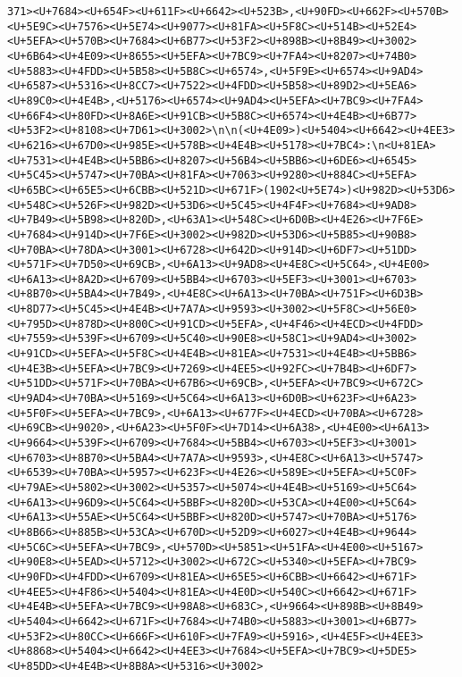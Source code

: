 \documentclass[
]{article}
\begin{document}
\begin{verbatim}
371><U+7684><U+654F><U+611F><U+6642><U+523B>,<U+90FD><U+662F><U+570B><U+5E9C><U+7576><U+5E74><U+9077><U+81FA><U+5F8C><U+514B><U+52E4><U+5EFA><U+570B><U+7684><U+6B77><U+53F2><U+898B><U+8B49><U+3002><U+6B64><U+4E09><U+8655><U+5EFA><U+7BC9><U+7FA4><U+8207><U+74B0><U+5883><U+4FDD><U+5B58><U+5B8C><U+6574>,<U+5F9E><U+6574><U+9AD4><U+6587><U+5316><U+8CC7><U+7522><U+4FDD><U+5B58><U+89D2><U+5EA6><U+89C0><U+4E4B>,<U+5176><U+6574><U+9AD4><U+5EFA><U+7BC9><U+7FA4><U+66F4><U+80FD><U+8A6E><U+91CB><U+5B8C><U+6574><U+4E4B><U+6B77><U+53F2><U+8108><U+7D61><U+3002>\n\n(<U+4E09>)<U+5404><U+6642><U+4EE3><U+6216><U+67D0><U+985E><U+578B><U+4E4B><U+5178><U+7BC4>:\n<U+81EA><U+7531><U+4E4B><U+5BB6><U+8207><U+56B4><U+5BB6><U+6DE6><U+6545><U+5C45><U+5747><U+70BA><U+81FA><U+7063><U+9280><U+884C><U+5EFA><U+65BC><U+65E5><U+6CBB><U+521D><U+671F>(1902<U+5E74>)<U+982D><U+53D6><U+548C><U+526F><U+982D><U+53D6><U+5C45><U+4F4F><U+7684><U+9AD8><U+7B49><U+5B98><U+820D>,<U+63A1><U+548C><U+6D0B><U+4E26><U+7F6E><U+7684><U+914D><U+7F6E><U+3002><U+982D><U+53D6><U+5B85><U+90B8><U+70BA><U+78DA><U+3001><U+6728><U+642D><U+914D><U+6DF7><U+51DD><U+571F><U+7D50><U+69CB>,<U+6A13><U+9AD8><U+4E8C><U+5C64>,<U+4E00><U+6A13><U+8A2D><U+6709><U+5BB4><U+6703><U+5EF3><U+3001><U+6703><U+8B70><U+5BA4><U+7B49>,<U+4E8C><U+6A13><U+70BA><U+751F><U+6D3B><U+8D77><U+5C45><U+4E4B><U+7A7A><U+9593><U+3002><U+5F8C><U+56E0><U+795D><U+878D><U+800C><U+91CD><U+5EFA>,<U+4F46><U+4ECD><U+4FDD><U+7559><U+539F><U+6709><U+5C40><U+90E8><U+58C1><U+9AD4><U+3002><U+91CD><U+5EFA><U+5F8C><U+4E4B><U+81EA><U+7531><U+4E4B><U+5BB6><U+4E3B><U+5EFA><U+7BC9><U+7269><U+4EE5><U+92FC><U+7B4B><U+6DF7><U+51DD><U+571F><U+70BA><U+67B6><U+69CB>,<U+5EFA><U+7BC9><U+672C><U+9AD4><U+70BA><U+5169><U+5C64><U+6A13><U+6D0B><U+623F><U+6A23><U+5F0F><U+5EFA><U+7BC9>,<U+6A13><U+677F><U+4ECD><U+70BA><U+6728><U+69CB><U+9020>,<U+6A23><U+5F0F><U+7D14><U+6A38>,<U+4E00><U+6A13><U+9664><U+539F><U+6709><U+7684><U+5BB4><U+6703><U+5EF3><U+3001><U+6703><U+8B70><U+5BA4><U+7A7A><U+9593>,<U+4E8C><U+6A13><U+5747><U+6539><U+70BA><U+5957><U+623F><U+4E26><U+589E><U+5EFA><U+5C0F><U+79AE><U+5802><U+3002><U+5357><U+5074><U+4E4B><U+5169><U+5C64><U+6A13><U+96D9><U+5C64><U+5BBF><U+820D><U+53CA><U+4E00><U+5C64><U+6A13><U+55AE><U+5C64><U+5BBF><U+820D><U+5747><U+70BA><U+5176><U+8B66><U+885B><U+53CA><U+670D><U+52D9><U+6027><U+4E4B><U+9644><U+5C6C><U+5EFA><U+7BC9>,<U+570D><U+5851><U+51FA><U+4E00><U+5167><U+90E8><U+5EAD><U+5712><U+3002><U+672C><U+5340><U+5EFA><U+7BC9><U+90FD><U+4FDD><U+6709><U+81EA><U+65E5><U+6CBB><U+6642><U+671F><U+4EE5><U+4F86><U+5404><U+81EA><U+4E0D><U+540C><U+6642><U+671F><U+4E4B><U+5EFA><U+7BC9><U+98A8><U+683C>,<U+9664><U+898B><U+8B49><U+5404><U+6642><U+671F><U+7684><U+74B0><U+5883><U+3001><U+6B77><U+53F2><U+80CC><U+666F><U+610F><U+7FA9><U+5916>,<U+4E5F><U+4EE3><U+8868><U+5404><U+6642><U+4EE3><U+7684><U+5EFA><U+7BC9><U+5DE5><U+85DD><U+4E4B><U+8B8A><U+5316><U+3002>

\end{verbatim}
\end{document}

